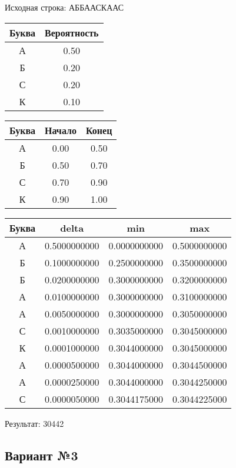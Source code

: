 \documentclass[a4paper, 12pt]{article}
\begin{document}
Исходная строка: АББААСКААС\
\begin{center}
 \begin{tabular}{ |c|c| } 
  \hline
     Буква & Вероятность \\ \hline
А & 0.50\\\hline
Б & 0.20\\\hline
С & 0.20\\\hline
К & 0.10
\\ \hline \end{tabular}
\end{center}
\begin{center}
 \begin{tabular}{ |c|c|c| } 
  \hline
     Буква & Начало & Конец \\ \hline
А & 0.00 & 0.50\\\hline
Б & 0.50 & 0.70\\\hline
С & 0.70 & 0.90\\\hline
К & 0.90 & 1.00
\\ \hline \end{tabular}
\end{center}
\begin{center}
 \begin{tabular}{ |c|c|c|c| } 
  \hline
     Буква & delta & min & max \\ \hline
А & 0.5000000000 & 0.0000000000 & 0.5000000000\\\hline
Б & 0.1000000000 & 0.2500000000 & 0.3500000000\\\hline
Б & 0.0200000000 & 0.3000000000 & 0.3200000000\\\hline
А & 0.0100000000 & 0.3000000000 & 0.3100000000\\\hline
А & 0.0050000000 & 0.3000000000 & 0.3050000000\\\hline
С & 0.0010000000 & 0.3035000000 & 0.3045000000\\\hline
К & 0.0001000000 & 0.3044000000 & 0.3045000000\\\hline
А & 0.0000500000 & 0.3044000000 & 0.3044500000\\\hline
А & 0.0000250000 & 0.3044000000 & 0.3044250000\\\hline
С & 0.0000050000 & 0.3044175000 & 0.3044225000
\\ \hline \end{tabular}
\end{center}
Результат: 30442
\pagebreak
\subsection{Вариант №3}
\end{document}
